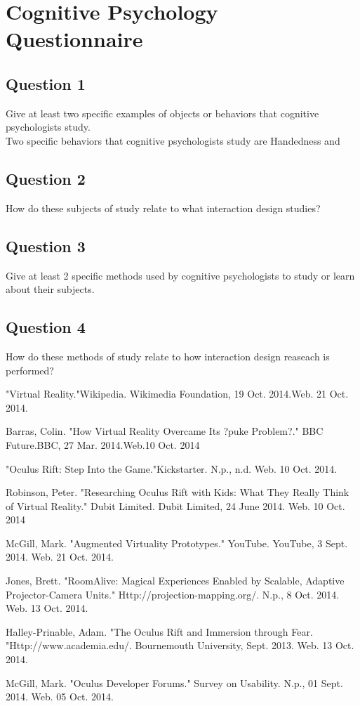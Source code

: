 \documentclass[a4paper]{article}
\begin{document}
\section{Cognitive Psychology Questionnaire}

\subsection{Question 1}
Give at least two specific examples of objects or behaviors that cognitive psychologists study.\\

Two specific behaviors that cognitive psychologists study are Handedness and 

\subsection{Question 2}
How do these subjects of study relate to what interaction design studies?\\

\subsection{Question 3}
Give at least 2 specific methods used by cognitive psychologists to study or learn about their subjects.\\

\subsection{Question 4}
How do these methods of study relate to how interaction design reaseach is performed?\\




\begin{thebibliography}{9}

"Virtual Reality."Wikipedia. Wikimedia Foundation, 19 Oct. 2014.Web. 21 Oct. 2014.

Barras, Colin.
"How Virtual Reality Overcame Its ?puke Problem?." BBC Future.BBC, 27 Mar. 2014.Web.10 Oct. 2014

"Oculus Rift: Step Into the Game."Kickstarter. N.p., n.d. Web. 10 Oct. 2014.
  
Robinson, Peter. "Researching Oculus Rift with Kids: What They Really Think of Virtual Reality." Dubit Limited. Dubit Limited, 24 June 2014. Web. 10 Oct. 2014

 McGill, Mark. "Augmented Virtuality Prototypes." YouTube. YouTube, 3 Sept. 2014. Web. 21 Oct. 2014.
 
Jones, Brett. "RoomAlive: Magical Experiences Enabled by Scalable, Adaptive Projector-Camera Units." Http://projection-mapping.org/. N.p., 8 Oct. 2014. Web. 13 Oct. 2014.

Halley-Prinable, Adam. "The Oculus Rift and Immersion through Fear. "Http://www.academia.edu/. Bournemouth University, Sept. 2013. Web. 13 Oct. 2014.  
  
McGill, Mark. "Oculus Developer Forums." Survey on Usability. N.p., 01 Sept. 2014. Web. 05 Oct. 2014.  

\end{thebibliography}
\end{document}
